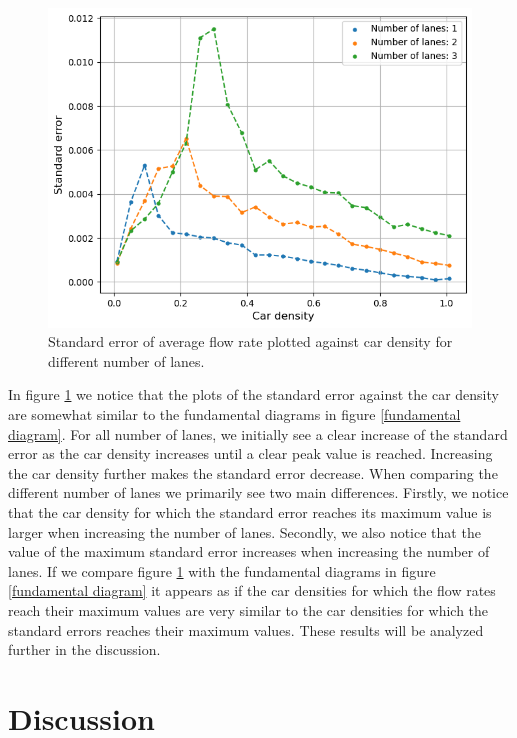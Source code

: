 \documentclass[a4paper,12pt]{article}
\begin{document}
\begin{figure}[H]
    \centering
    \includegraphics[scale=0.9]{Images/standard error 120.png}
    \caption{Standard error of average flow rate plotted against car density for different number of lanes.}
    \label{standard error}
\end{figure}

In figure \ref*{standard error} we notice that the plots of the standard error against the car density are somewhat similar to the fundamental diagrams
in figure \ref*{fundamental diagram}. For all number of lanes, we initially see a clear increase of the standard error as the car density increases
until a clear peak value is reached. Increasing the car density further makes the standard error decrease. When comparing the different number of lanes we primarily
see two main differences. Firstly, we notice that the car density for which the standard error reaches its maximum value is larger when increasing the number of lanes.
Secondly, we also notice that the value of the maximum standard error increases when increasing the number of lanes. If we compare figure \ref*{standard error} with the fundamental
diagrams in figure \ref*{fundamental diagram} it appears as if the car densities for which the flow rates reach their maximum
values are very similar to the car densities for which the standard errors reaches their maximum values. These results will be analyzed further in the discussion.

\section*{Discussion}
\end{document}

